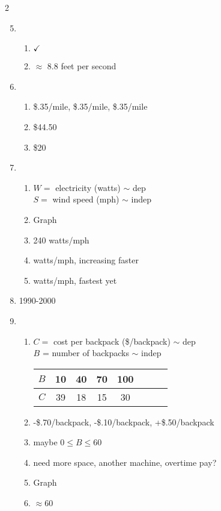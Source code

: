 \begin{multicols} {2}
\begin{enumerate}
\setcounter{enumi}{4}

\item %
\begin{enumerate}
\item $\checkmark$
\item $\approx$ 8.8 feet per second
\end{enumerate}

\item %
\begin{enumerate}
\item \$.35/mile,  \$.35/mile,  \$.35/mile
\item \$44.50
\item \$20
\end{enumerate}

\item %
\begin{enumerate}
\item $W =$ electricity (watts) $\sim$ dep \\ $S=$ wind speed (mph) $\sim$ indep 
\item Graph
\item 240 watts/mph
\item {} watts/mph, increasing faster
\item  {} watts/mph, fastest yet
\end{enumerate}

\item %
1990-2000

\item %
\begin{enumerate}
\item $C=$ cost per backpack (\$/backpack) $\sim$ dep \\ $B$ = number of backpacks $\sim$ indep \\
\begin{tabular} {|c| |c|c |c|c |c|c |c|}\hline
$B$ & 10 & 40 & 70 & 100\\ \hline
$C$ & 39 & 18 & 15 & 30  \\ \hline
\end{tabular}
\item -\$.70/backpack, -\$.10/backpack, +\$.50/backpack
\item maybe $0 \le B \le 60$
\item need more space, another machine, overtime pay?
\item Graph
\item $\approx 60$ 


\end{enumerate}
\end{enumerate}
\end{multicols}
